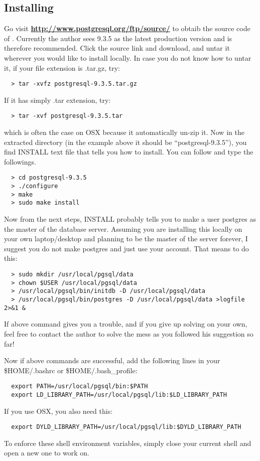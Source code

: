 \subsection{Installing {\psql}}
Go visit 
\href{http://www.postgresql.org/ftp/source/}{{\color{blue}\bf http://www.postgresql.org/ftp/source/}}
to obtaib the source code of {\psql}. Currently the author sees 9.3.5 as the latest production 
version and is therefore recommended. Click the source link and download, and untar it wherever
you would like to install locally. In case you do not know how to untar it, if your file extension
is {\ttfamily .tar.gz}, try:
\begin{lstlisting}
  > tar -xvfz postgresql-9.3.5.tar.gz
\end{lstlisting}
If it has simply {\ttfamily .tar} extension, try:
\begin{lstlisting}
  > tar -xvf postgresql-9.3.5.tar
\end{lstlisting}
which is often the case on OSX because it automatically un-zip it.
Now in the extracted directory (in the example above it should be ``postgresql-9.3.5''), you
find {\ttfamily INSTALL} text file that tells you how to install. You can follow and type
the followings.
\begin{lstlisting}
  > cd postgresql-9.3.5
  > ./configure
  > make
  > sudo make install
\end{lstlisting}
Now from the next steps, {\ttfamily INSTALL} probably tells you to make a user {\ttfamily postgres}
as the master of the database server. Assuming you are installing this locally on your own 
laptop/desktop and planning to be the master of the server forever, I suggest you do not make
{\ttfamily postgres} and just use your account. That means to do this:
\begin{lstlisting}
  > sudo mkdir /usr/local/pgsql/data
  > chown $USER /usr/local/pgsql/data
  > /usr/local/pgsql/bin/initdb -D /usr/local/pgsql/data
  > /usr/local/pgsql/bin/postgres -D /usr/local/pgsql/data >logfile 2>&1 &
\end{lstlisting}
If above command gives you a trouble, and if you give up solving on your own, feel free to
contact the author to solve the mess as you followed his suggestion so far!

Now if above commands are successful, add the following lines in your {\ttfamily \$HOME/.bashrc}
or {\ttfamily \$HOME/.bash\_profile}:
\begin{lstlisting}
  export PATH=/usr/local/pgsql/bin:$PATH
  export LD_LIBRARY_PATH=/usr/local/pgsql/lib:$LD_LIBRARY_PATH
\end{lstlisting}
If you use OSX, you also need this:
\begin{lstlisting}
  export DYLD_LIBRARY_PATH=/usr/local/pgsql/lib:$DYLD_LIBRARY_PATH
\end{lstlisting}
To enforce these shell environment variables, simply close your current shell and open
a new one to work on.

